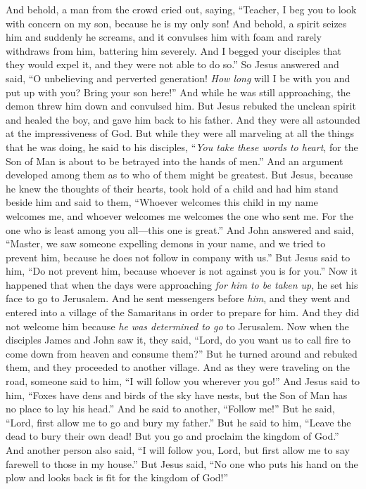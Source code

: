 \begin{biblechapter}
\verse And behold, a man from the crowd cried out, saying, “Teacher, I beg you to look with concern on my son, because he is my only son!
\verse And behold, a spirit seizes him and suddenly he screams, and it convulses him with foam and rarely withdraws from him, battering him severely.
\verse And I begged your disciples that they would expel it, and they were not able to do so.”
\verse So Jesus answered and said, “O unbelieving and perverted generation! \textit{How long} will I be with you and put up with you? Bring your son here!”
\verse And while he was still approaching, the demon threw him down and convulsed him. But Jesus rebuked the unclean spirit and healed the boy, and gave him back to his father.
\verse And they were all astounded at the impressiveness of God.
 But while they were all marveling at all the things that he was doing, he said to his disciples,
\verse “\textit{You take these words to heart}, for the Son of Man is about to be betrayed into the hands of men.”
 And an argument developed among them as to who of them might be greatest.
\verse But Jesus, because he knew the thoughts of their hearts, took hold of a child and had him stand beside him
\verse and said to them, “Whoever welcomes this child in my name welcomes me, and whoever welcomes me welcomes the one who sent me. For the one who is least among you all—this one is great.”
 And John answered and said, “Master, we saw someone expelling demons in your name, and we tried to prevent him, because he does not follow in company with us.”
\verse But Jesus said to him, “Do not prevent him, because whoever is not against you is for you.”
 Now it happened that when the days were approaching \textit{for him to be taken up}, he set his face to go to Jerusalem.
\verse And he sent messengers before \textit{him}, and they went and entered into a village of the Samaritans in order to prepare for him.
\verse And they did not welcome him because \textit{he was determined to go} to Jerusalem.
\verse Now when the disciples James and John saw it, they said, “Lord, do you want us to call fire to come down from heaven and consume them?”
\verse But he turned around and rebuked them,
\verse and they proceeded to another village.
 And as they were traveling on the road, someone said to him, “I will follow you wherever you go!”
\verse And Jesus said to him, “Foxes have dens and birds of the sky have nests, but the Son of Man has no place to lay his head.”
\verse And he said to another, “Follow me!” But he said, “Lord, first allow me to go and bury my father.”
\verse But he said to him, “Leave the dead to bury their own dead! But you go and proclaim the kingdom of God.”
\verse And another person also said, “I will follow you, Lord, but first allow me to say farewell to those in my house.”
\verse But Jesus said, “No one who puts his hand on the plow and looks back is fit for the kingdom of God!”
\end{biblechapter}

